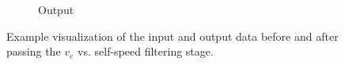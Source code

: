 \begin{figure}[!htbp]
\begin{subfigure}{0.24\textwidth}
  \caption{Output}
\end{subfigure}
\caption{Example visualization of the input and output data before and after passing the $v_{e}$ vs. self-speed filtering stage.}
\label{fig:example_ve_filtering_stage}
\end{figure}
\FloatBarrier\noindent